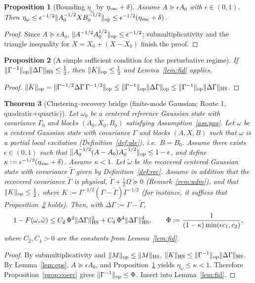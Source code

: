 \documentclass[11pt]{article}
\newtheorem{theorem}{Theorem}[section]
\newtheorem{proposition}[theorem]{Proposition}
\theoremstyle{remark}
\newcommand{\HS}{{\rm HS}}
\newcommand{\op}{{\rm op}}
\begin{document}
\begin{proposition}[Bounding $\eta_\omega$ by $\eta_{\rm vac} + \delta$]
\label{prop:eta}
Assume $A \succeq \epsilon A_0$ with $\epsilon \in (0,1)$. Then
$\eta_\omega \le \epsilon^{-1/2}\|A_0^{-1/2}XB_0^{-1/2}\|_\op
\le \epsilon^{-1/2}(\eta_{\rm vac} + \delta)$.
\end{proposition}
\begin{proof}
Since $A \succeq \epsilon A_0$, $\|A^{-1/2}A_0^{1/2}\|_\op \le
\epsilon^{-1/2}$; submultiplicativity and the triangle inequality for
$X = X_0 + (X - X_0)$ finish the proof.
\end{proof}

\begin{proposition}[A simple sufficient condition for the perturbative regime]
\label{prop:suff}
If $\|\Gamma^{-1}\|_\op \|\Delta\Gamma\|_\HS \le \frac12$, then
$\|K\|_\op \le \frac12$ and Lemma~\ref{lem:fid} applies.
\end{proposition}
\begin{proof}
$\|K\|_\op = \|\Gamma^{-1/2}\Delta\Gamma\,\Gamma^{-1/2}\|_\op \le
\|\Gamma^{-1}\|_\op\|\Delta\Gamma\|_\op \le
\|\Gamma^{-1}\|_\op\|\Delta\Gamma\|_\HS$.
\end{proof}

\begin{theorem}[Clustering--recovery bridge (finite-mode Gaussian; Route 1,
quadratic+quartic)]
\label{thm:main}
Let $\omega_0$ be a centered reference Gaussian state with covariance
$\Gamma_0$ and blocks $(A_0, X_0, B_0)$ satisfying
Assumption~\ref{ass:pos}. Let $\omega$ be a centered Gaussian state with
covariance $\Gamma$ and blocks $(A, X, B)$ such that $\omega$ is a partial
local excitation (Definition~\ref{def:ple}), i.e.\ $B = B_0$. Assume there
exists $\epsilon \in (0,1)$ such that
$\|A_0^{-1/2}(A - A_0)A_0^{-1/2}\|_\op \le 1 - \epsilon$, and define
$\kappa := \epsilon^{-1/2}(\eta_{\rm vac} + \delta)$. Assume $\kappa < 1$.
Let $\tilde\omega$ be the recovered centered Gaussian state with covariance
$\tilde\Gamma$ given by Definition~\ref{def:rec}. Assume in addition that the recovered covariance $\tilde\Gamma$ is
physical, $\tilde\Gamma + \frac{i}{2}\Omega \succeq 0$
(Remark~\ref{rem:adm}), and that
$\|K\|_\op \le \frac12$, where
$K := \Gamma^{-1/2}(\Gamma - \tilde\Gamma)\Gamma^{-1/2}$ (for instance, it
suffices that Proposition~\ref{prop:suff} holds). Then, with
$\Delta\Gamma := \Gamma - \tilde\Gamma$,
\[
1 - F(\omega, \tilde\omega) \le
C_2\, \Phi^2 \|\Delta\Gamma\|_\HS^2 + C_4\, \Phi^4 \|\Delta\Gamma\|_\HS^4,
\qquad
\Phi := \frac{1}{(1-\kappa)\min(\epsilon c_1, c_2)},
\]
where $C_2, C_4 > 0$ are the constants from Lemma~\ref{lem:fid}.
\end{theorem}
\begin{proof}
By submultiplicativity and $\|M\|_\op \le \|M\|_\HS$,
$\|K\|_\HS \le \|\Gamma^{-1}\|_\op \|\Delta\Gamma\|_\HS$. By
Lemma~\ref{lem:eps}, $A \succeq \epsilon A_0$, and
Proposition~\ref{prop:eta} yields $\eta_\omega \le \kappa < 1$. Therefore
Proposition~\ref{prop:coerc} gives $\|\Gamma^{-1}\|_\op \le \Phi$. Insert
into Lemma~\ref{lem:fid}.
\end{proof}
\end{document}
